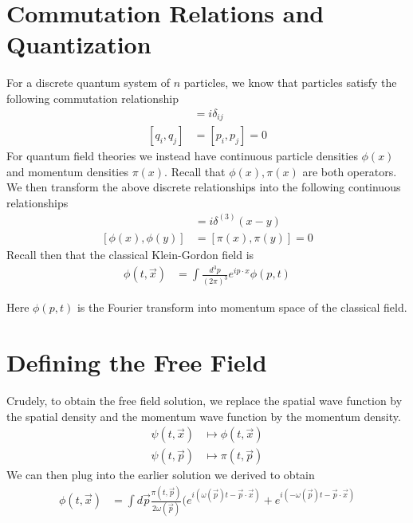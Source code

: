 \documentclass[book.tex]{subfiles}
\begin{document}
\section{Commutation Relations and Quantization}
For a discrete quantum system of $n$ particles, we know that particles satisfy the following commutation relationship
\begin{align}
    [q_i, p_j] &= i \delta_{ij} \\
    [q_i, q_j] &= [p_i, p_j] = 0
\end{align}
For quantum field theories we instead have continuous particle densities $\phi(x)$ and momentum densities $\pi(x)$. Recall that $\phi(x),\pi(x)$ are both operators. We then transform the above discrete relationships into the following continuous relationships
\begin{align}
    [\phi(x), \pi(y)] &= i \delta^{(3)}(x-y) \\
    [\phi(x), \phi(y)] &= [\pi(x), \pi(y)] = 0
\end{align}
Recall then that the classical Klein-Gordon field is
\begin{align}
    \phi(t, \vec{x}) &= \int \frac{d^3p}{(2\pi)^3} e^{i p \cdot x} \phi(p, t)
\end{align}

Here $\phi(p, t)$ is the Fourier transform into momentum space of the classical field.

\section{Defining the Free Field}

Crudely, to obtain the free field solution, we replace the spatial wave function by the spatial density and the momentum wave function by the momentum density.
\begin{align}
    \psi(t, \vec{x}) &\mapsto \phi(t, \vec{x}) \\
    \psi(t, \vec{p}) &\mapsto \pi(t, \vec{p})
\end{align}
We can then plug into the earlier solution we derived to obtain
\begin{align}
    \phi(t, \vec{x}) &= \int d\vec{p} \frac{\pi(t, \vec{p})}{2 \omega(\vec{p})} (e^{i(\omega(\vec{p}) t - \vec{p} \cdot \vec{x})} + e^{i(-\omega(\vec{p}) t - \vec{p} \cdot \vec{x})}
\end{align}
\end{document}
